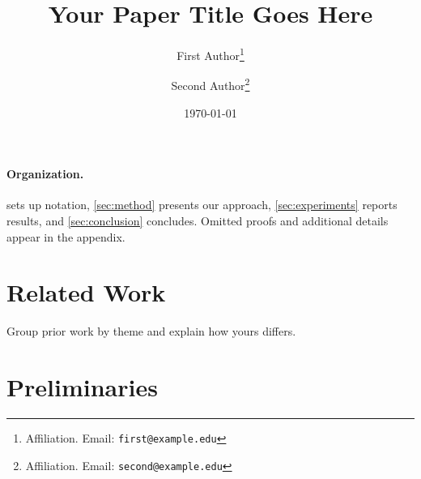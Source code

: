 \documentclass[11pt]{article}
\title{Your Paper Title Goes Here}
\author{
  First Author\thanks{Affiliation. Email: \texttt{first@example.edu}}
  \and
  Second Author\thanks{Affiliation. Email: \texttt{second@example.edu}}
}
\date{\today}
\theoremstyle{definition}
\theoremstyle{remark}
\begin{document}
\maketitle





\paragraph{Organization.}
 sets up notation, \cref{sec:method} presents our approach,
\cref{sec:experiments} reports results, and \cref{sec:conclusion} concludes.
Omitted proofs and additional details appear in the appendix.

\section{Related Work}\label{sec:related}
Group prior work by theme and explain how yours differs.

\section{Preliminaries}\label{sec:prelim}
\end{document}
